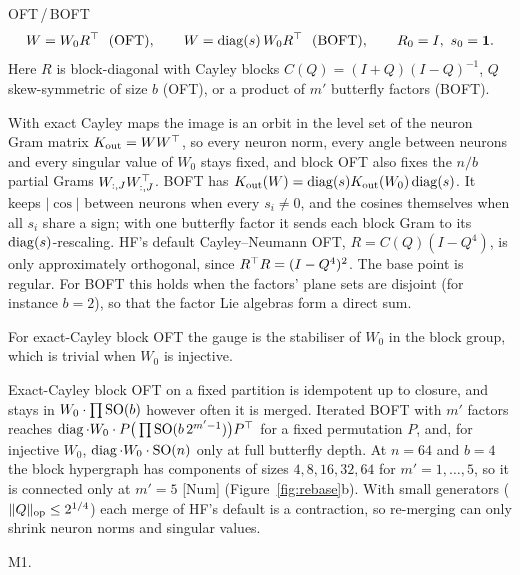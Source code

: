 \begin{example*}{OFT\,/\,BOFT}\label{ex:oft}%
\[
  W=W_0R^{\top}\ \ \text{(OFT)},\qquad W=\operatorname{diag}(s)\,W_0R^{\top}\ \ \text{(BOFT)},\qquad R_0=I,\ s_0=\mathbf 1.
\]
Here $R$ is block-diagonal with Cayley blocks $C(Q)=(I+Q)(I-Q)^{-1}$, $Q$ skew-symmetric of size $b$ (OFT), or a
product of $m'$ butterfly factors (BOFT).
\begin{exVIIlines}
\item[Image] With exact Cayley maps the image is an orbit in the level set of the neuron Gram matrix
  $K_{\rm out}=WW^{\top}$, so every neuron norm, every angle between neurons and every singular value of $W_0$ stays fixed,
  and block OFT also fixes the $n/b$ partial Grams $W_{:,J}W_{:,J}^{\top}$. BOFT has
  $K_{\rm out}(W)=\operatorname{diag}(s)K_{\rm out}(W_0)\operatorname{diag}(s)$. It keeps $\lvert\cos\rvert$ between neurons when every
  $s_i\ne0$, and the cosines themselves when all $s_i$ share a sign; with one butterfly factor it sends each block Gram
  to its $\operatorname{diag}(s)$-rescaling. HF's default Cayley--Neumann OFT, $R=C(Q)(I-Q^4)$, is only approximately orthogonal,
  since $R^{\top} R=(I-Q^4)^2$. The base point is regular. For BOFT this holds when the factors' plane sets are disjoint
  (for instance $b=2$), so that the factor Lie algebras form a direct sum.
\item[Fibre] For exact-Cayley block OFT the gauge is the stabiliser of $W_0$ in the block group, which is trivial
  when $W_0$ is injective.
\item[Base] Exact-Cayley block OFT on a fixed partition is idempotent up to closure, and stays in
  $W_0\cdot\prod\mathrm{SO}(b)$ however often it is merged. Iterated BOFT with $m'$ factors reaches
  $\operatorname{diag}\cdot W_0\cdot P\big(\prod\mathrm{SO}(b\,2^{m'-1})\big)P^{\top}$ for a fixed permutation $P$, and, for injective $W_0$,
  $\operatorname{diag}\cdot W_0\cdot\mathrm{SO}(n)$ only at full butterfly depth. At $n=64$
  and $b=4$ the block hypergraph has components of sizes $4,8,16,32,64$ for $m'=1,\dots,5$, so it is connected only at
  $m'=5$ [Num] (Figure~\ref{fig:rebase}b). With small generators ($\lVert Q\rVert_{\rm op}\le2^{1/4}$) each merge of
  HF's default is a contraction, so re-merging can only shrink neuron norms and singular values.
\item[Merge] M1.
\end{exVIIlines}
\end{example*}

